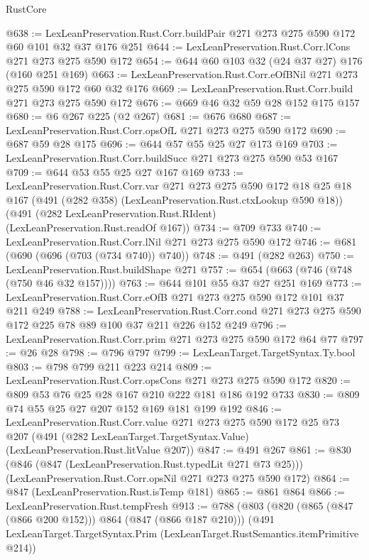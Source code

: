 \begin{lexlean}{RustCore}
\begin{coremodule}
@638 := LexLeanPreservation.Rust.Corr.buildPair @271 @273 @275 @590 @172 @60 @101 @32 @37 @176 @251
@644 := LexLeanPreservation.Rust.Corr.lCons @271 @273 @275 @590 @172
@654 := @644 @60 @103 @32 (@24 @37 @27) @176 (@160 @251 @169)
@663 := LexLeanPreservation.Rust.Corr.eOfBNil @271 @273 @275 @590 @172 @60 @32 @176
@669 := LexLeanPreservation.Rust.Corr.build @271 @273 @275 @590 @172
@676 := @669 @46 @32 @59 @28 @152 @175 @157
@680 := @6 @267 @225 (@2 @267)
@681 := @676 @680
@687 := LexLeanPreservation.Rust.Corr.opsOfL @271 @273 @275 @590 @172
@690 := @687 @59 @28 @175
@696 := @644 @57 @55 @25 @27 @173 @169
@703 := LexLeanPreservation.Rust.Corr.buildSucc @271 @273 @275 @590 @53 @167
@709 := @644 @53 @55 @25 @27 @167 @169
@733 := LexLeanPreservation.Rust.Corr.var
    @271
    @273
    @275
    @590
    @172
    @18
    @25
    @18
    @167
    (@491 (@282 @358) (LexLeanPreservation.Rust.ctxLookup @590 @18))
    (@491 (@282 LexLeanPreservation.Rust.RIdent) (LexLeanPreservation.Rust.readOf @167))
@734 := @709 @733
@740 := LexLeanPreservation.Rust.Corr.lNil @271 @273 @275 @590 @172
@746 := @681 (@690 (@696 (@703 (@734 @740)) @740))
@748 := @491 (@282 @263)
@750 := LexLeanPreservation.Rust.buildShape @271
@757 := @654 (@663 (@746 (@748 (@750 @46 @32 @157))))
@763 := @644 @101 @55 @37 @27 @251 @169
@773 := LexLeanPreservation.Rust.Corr.eOfB @271 @273 @275 @590 @172 @101 @37 @211 @249
@788 := LexLeanPreservation.Rust.Corr.cond
    @271
    @273
    @275
    @590
    @172
    @225
    @78
    @89
    @100
    @37
    @211
    @226
    @152
    @249
@796 := LexLeanPreservation.Rust.Corr.prim @271 @273 @275 @590 @172 @64 @77
@797 := @26 @28
@798 := @796 @797
@799 := LexLeanTarget.TargetSyntax.Ty.bool
@803 := @798 @799 @211 @223 @214
@809 := LexLeanPreservation.Rust.Corr.opsCons @271 @273 @275 @590 @172
@820 := @809 @53 @76 @25 @28 @167 @210 @222 @181 @186 @192 @733
@830 := @809 @74 @55 @25 @27 @207 @152 @169 @181 @199 @192
@846 := LexLeanPreservation.Rust.Corr.value
    @271
    @273
    @275
    @590
    @172
    @25
    @73
    @207
    (@491 (@282 LexLeanTarget.TargetSyntax.Value) (LexLeanPreservation.Rust.litValue @207))
@847 := @491 @267
@861 := @830
    (@846 (@847 (LexLeanPreservation.Rust.typedLit @271 @73 @25)))
    (LexLeanPreservation.Rust.Corr.opsNil @271 @273 @275 @590 @172)
@864 := @847 (LexLeanPreservation.Rust.isTemp @181)
@865 := @861 @864
@866 := LexLeanPreservation.Rust.tempFresh
@913 := @788
    (@803
      (@820 (@865 (@847 (@866 @200 @152))) @864 (@847 (@866 @187 @210)))
      (@491 LexLeanTarget.TargetSyntax.Prim (LexLeanTarget.RustSemantics.itemPrimitive @214))

\end{coremodule}
\end{lexlean}

